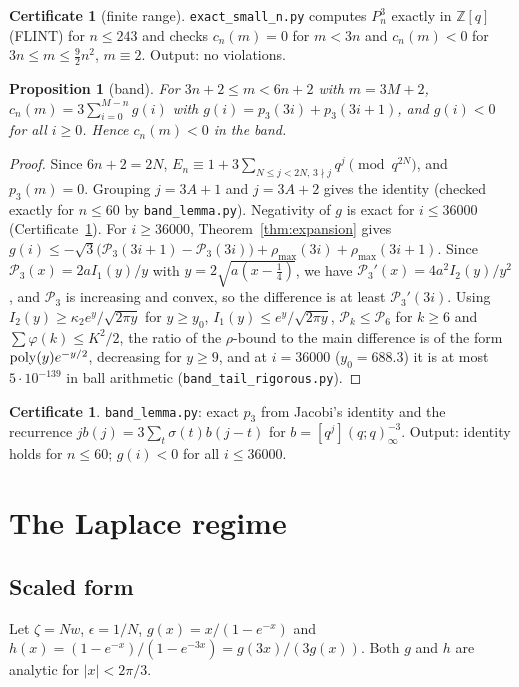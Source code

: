 \documentclass[11pt,reqno]{amsart}
\theoremstyle{plain}
\newtheorem{proposition}[theorem]{Proposition}
\theoremstyle{definition}
\newtheorem{certificate}[theorem]{Certificate}
\newcommand{\cP}{\mathcal P}
\newcommand{\Z}{\mathbb Z}
\begin{document}
\begin{certificate}[finite range]\label{cert:finite}
\texttt{exact\_small\_n.py} computes $P_n^3$ exactly in $\Z[q]$ (FLINT) for $n\le243$ and checks $c_n(m)=0$ for $m<3n$ and
$c_n(m)<0$ for $3n\le m\le\frac92n^2$, $m\equiv2$. Output: no violations.
\end{certificate}

\begin{proposition}[band]\label{sec:band}
For $3n+2\le m<6n+2$ with $m=3M+2$, $c_n(m)=3\sum_{i=0}^{M-n}g(i)$ with $g(i)=p_3(3i)+p_3(3i+1)$, and $g(i)<0$ for all $i\ge0$.
Hence $c_n(m)<0$ in the band.
\end{proposition}
\begin{proof}
Since $6n+2=2N$, $E_n\equiv1+3\sum_{N\le j<2N,\,3\nmid j}q^j\pmod{q^{2N}}$, and $p_3(m)=0$. Grouping $j=3A+1$ and $j=3A+2$ gives
the identity (checked exactly for $n\le60$ by \texttt{band\_lemma.py}). Negativity of $g$ is exact for $i\le36000$
(Certificate~\ref{cert:band}). For $i\ge36000$, Theorem~\ref{thm:expansion} gives
$g(i)\le-\sqrt3\big(\cP_3(3i+1)-\cP_3(3i)\big)+\rho_{\max}(3i)+\rho_{\max}(3i+1)$. Since $\cP_3(x)=2aI_1(y)/y$ with
$y=2\sqrt{a(x-\frac14)}$, we have $\cP_3'(x)=4a^2I_2(y)/y^2$, and $\cP_3$ is increasing and convex, so the difference is at least
$\cP_3'(3i)$. Using $I_2(y)\ge\kappa_2e^y/\sqrt{2\pi y}$ for $y\ge y_0$, $I_1(y)\le e^y/\sqrt{2\pi y}$, $\cP_k\le\cP_6$ for $k\ge6$ and
$\sum\varphi(k)\le K^2/2$, the ratio of the $\rho$-bound to the main difference is of the form ${\rm poly}(y)e^{-y/2}$, decreasing for
$y\ge9$, and at $i=36000$ ($y_0=688.3$) it is at most $5\cdot10^{-139}$ in ball arithmetic (\texttt{band\_tail\_rigorous.py}).
\end{proof}

\begin{certificate}\label{cert:band}
\texttt{band\_lemma.py}: exact $p_3$ from Jacobi's identity and the recurrence $jb(j)=3\sum_t\sigma(t)b(j-t)$ for
$b=[q^j](q;q)^{-3}_\infty$. Output: identity holds for $n\le60$; $g(i)<0$ for all $i\le36000$.
\end{certificate}

\section{The Laplace regime}\label{sec:laplace}

\subsection{Scaled form}
Let $\zeta=Nw$, $\epsilon=1/N$, $g(x)=x/(1-e^{-x})$ and $h(x)=(1-e^{-x})/(1-e^{-3x})=g(3x)/(3g(x))$. Both $g$ and $h$ are analytic
for $|x|<2\pi/3$.
\end{document}
